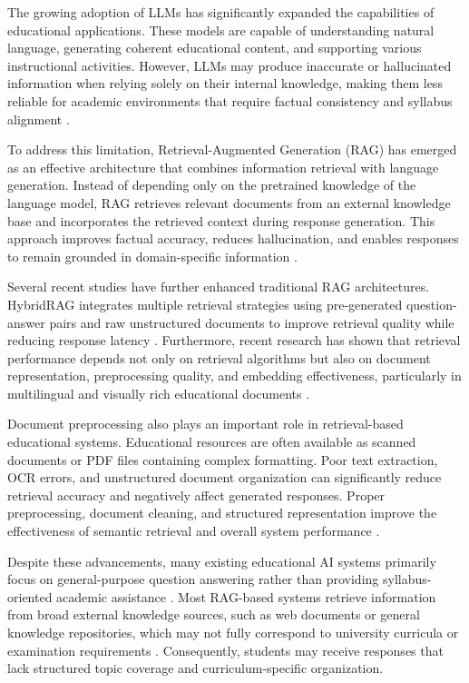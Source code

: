 The growing adoption of LLMs has significantly expanded the capabilities of educational applications. These models are capable of understanding natural language, generating coherent educational content, and supporting various instructional activities. However, LLMs may produce inaccurate or hallucinated information when relying solely on their internal knowledge, making them less reliable for academic environments that require factual consistency and syllabus alignment \cite{4gan2023llmeducation,5lewis2020rag}. \par

To address this limitation, Retrieval-Augmented Generation (RAG) has emerged as an effective architecture that combines information retrieval with language generation. Instead of depending only on the pretrained knowledge of the language model, RAG retrieves relevant documents from an external knowledge base and incorporates the retrieved context during response generation. This approach improves factual accuracy, reduces hallucination, and enables responses to remain grounded in domain-specific information \cite{5lewis2020rag}. \par

Several recent studies have further enhanced traditional RAG architectures. HybridRAG integrates multiple retrieval strategies using pre-generated question-answer pairs and raw unstructured documents to improve retrieval quality while reducing response latency \cite{3kim2025hybridrag}. Furthermore, recent research has shown that retrieval performance depends not only on retrieval algorithms but also on document representation, preprocessing quality, and embedding effectiveness, particularly in multilingual and visually rich educational documents \cite{6asenov2025retrieval}. \par

Document preprocessing also plays an important role in retrieval-based educational systems. Educational resources are often available as scanned documents or PDF files containing complex formatting. Poor text extraction, OCR errors, and unstructured document organization can significantly reduce retrieval accuracy and negatively affect generated responses. Proper preprocessing, document cleaning, and structured representation improve the effectiveness of semantic retrieval and overall system performance \cite{2yadav2022summarization,6asenov2025retrieval}. \par

Despite these advancements, many existing educational AI systems primarily focus on general-purpose question answering rather than providing syllabus-oriented academic assistance \cite{1wang2023its,4gan2023llmeducation}. Most RAG-based systems retrieve information from broad external knowledge sources, such as web documents or general knowledge repositories, which may not fully correspond to university curricula or examination requirements \cite{5lewis2020rag}. Consequently, students may receive responses that lack structured topic coverage and curriculum-specific organization. \par

